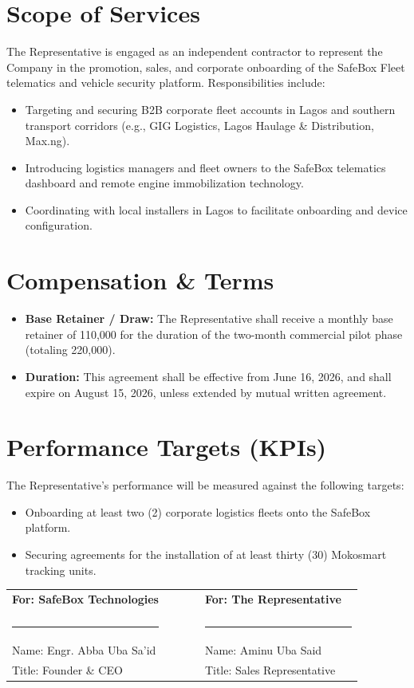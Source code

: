 \documentclass[11pt,a4paper]{article}
\begin{document}
\section{Scope of Services}
The Representative is engaged as an independent contractor to represent the Company in the promotion, sales, and corporate onboarding of the SafeBox Fleet telematics and vehicle security platform. Responsibilities include:
\begin{itemize}
    \item Targeting and securing B2B corporate fleet accounts in Lagos and southern transport corridors (e.g., GIG Logistics, Lagos Haulage \& Distribution, Max.ng).
    \item Introducing logistics managers and fleet owners to the SafeBox telematics dashboard and remote engine immobilization technology.
    \item Coordinating with local installers in Lagos to facilitate onboarding and device configuration.
\end{itemize}

\section{Compensation \& Terms}
\begin{itemize}
    \item \textbf{Base Retainer / Draw:} The Representative shall receive a monthly base retainer of 110,000 for the duration of the two-month commercial pilot phase (totaling 220,000).
    \item \textbf{Duration:} This agreement shall be effective from June 16, 2026, and shall expire on August 15, 2026, unless extended by mutual written agreement.
\end{itemize}

\section{Performance Targets (KPIs)}
The Representative's performance will be measured against the following targets:
\begin{itemize}
    \item Onboarding at least two (2) corporate logistics fleets onto the SafeBox platform.
    \item Securing agreements for the installation of at least thirty (30) Mokosmart tracking units.
\end{itemize}

\vspace{1.0cm}

\noindent\begin{tabular}{p{0.45\linewidth} p{0.1\linewidth} p{0.45\linewidth}}
    \textbf{For: SafeBox Technologies} & & \textbf{For: The Representative} \\
    & & \\
    \rule{0.9\linewidth}{0.5pt} & & \rule{0.9\linewidth}{0.5pt} \\
    Name: Engr. Abba Uba Sa'id & & Name: Aminu Uba Said \\
    Title: Founder \& CEO & & Title: Sales Representative \\
\end{tabular}
\end{document}
